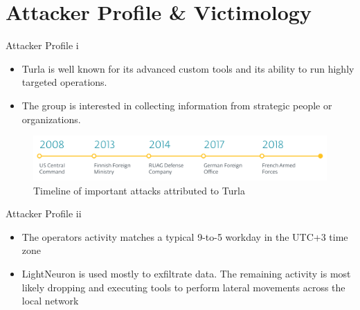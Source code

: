 \section{Attacker Profile \& Victimology}

\begin{frame}[fragile]{Attacker Profile i}
  \begin{itemize}
    \item Turla is well known for its advanced custom tools and its ability to run highly targeted operations.
    \item The group is interested in collecting information from strategic people
    or organizations.
  \end{itemize}
  \begin{figure}
    \includegraphics[width=\textwidth]{figures/timeline.PNG}
    \caption{Timeline of important attacks attributed to Turla}
  \end{figure}
\end{frame}

\begin{frame}[fragile]{Attacker Profile ii}
    \begin{itemize}
      \item The operators activity matches a typical 9-to-5 workday in the UTC+3 time zone
      \item LightNeuron is used mostly to exfiltrate data. The remaining activity is most likely dropping
      and executing tools to perform lateral movements across the local network
    \end{itemize}
    \begin{figure}
      \centering
      \qquad
    \end{figure}
\end{frame}


